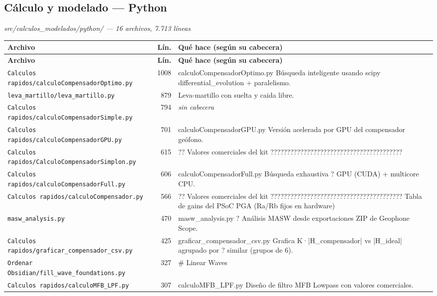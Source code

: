 \subsection{C\'alculo y modelado --- Python}
\textit{\small src/calculos\_modelados/python/ --- 16 archivos, 7.713 l\'ineas}
\footnotesize
\begin{longtable}{@{}p{5.4cm} r p{8.6cm}@{}}
\toprule \textbf{Archivo} & \textbf{L\'in.} & \textbf{Qu\'e hace (seg\'un su cabecera)} \\ \midrule
\endfirsthead
\toprule \textbf{Archivo} & \textbf{L\'in.} & \textbf{Qu\'e hace (seg\'un su cabecera)} \\ \midrule
\endhead
\bottomrule \endfoot
\texttt{\scriptsize Calculos rapidos/calculoCompensadorOptimo.py} & 1008 & calculoCompensadorOptimo.py Búsqueda inteligente usando scipy differential\_evolution + paralelismo. \\
\texttt{\scriptsize leva\_martillo/leva\_martillo.py} & 879 & Leva-martillo con suelta y caida libre. \\
\texttt{\scriptsize Calculos rapidos/calculoCompensadorSimple.py} & 794 & \textit{sin cabecera} \\
\texttt{\scriptsize Calculos rapidos/calculoCompensadorGPU.py} & 701 & calculoCompensadorGPU.py Versión acelerada por GPU del compensador geófono. \\
\texttt{\scriptsize Calculos rapidos/CalculoCompensadorSimplon.py} & 615 & ?? Valores comerciales del kit ???????????????????????????????????????? \\
\texttt{\scriptsize Calculos rapidos/calculoCompensadorFull.py} & 606 & calculoCompensadorFull.py Búsqueda exhaustiva ? GPU (CUDA) + multicore CPU. \\
\texttt{\scriptsize Calculos rapidos/calculoCompensador.py} & 566 & ?? Valores comerciales del kit ???????????????????????????????????????? Tabla de gains del PSoC PGA (Ra/Rb fijos en hardware) \\
\texttt{\scriptsize masw\_analysis.py} & 470 & masw\_analysis.py ? Análisis MASW desde exportaciones ZIP de Geophone Scope. \\
\texttt{\scriptsize Calculos rapidos/graficar\_compensador\_csv.py} & 425 & graficar\_compensador\_csv.py Grafica K·|H\_compensador| vs |H\_ideal| agrupado por ? similar (grupos de 6). \\
\texttt{\scriptsize Ordenar Obsidian/fill\_wave\_foundations.py} & 327 & \# Linear Waves \\
\texttt{\scriptsize Calculos rapidos/calculoMFB\_LPF.py} & 307 & calculoMFB\_LPF.py Diseño de filtro MFB Lowpass con valores comerciales. \\

\end{longtable}
